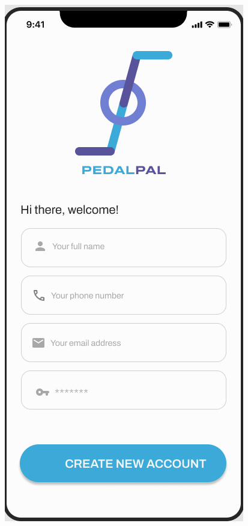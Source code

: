 \begin{figure}[h]
    \includegraphics[scale=0.35]{ui-images/Register.png}
    \hspace{30pt}

\end{figure}
